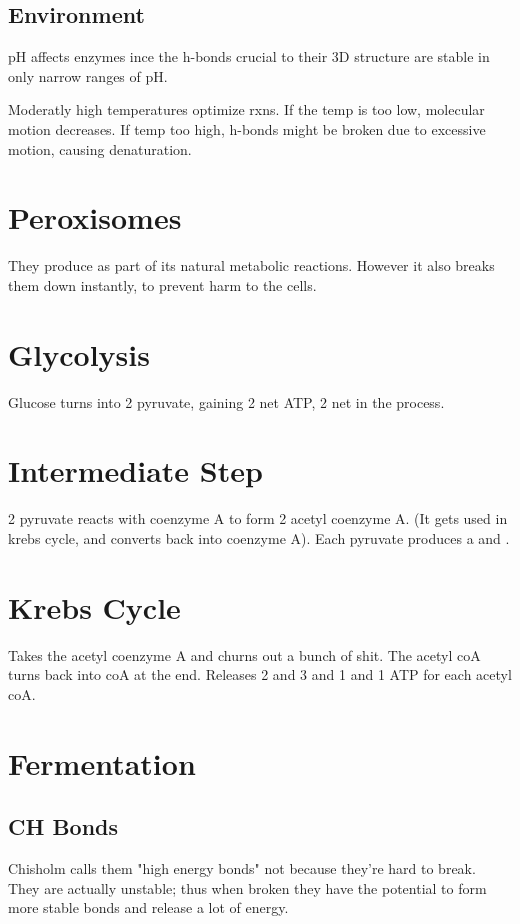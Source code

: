\documentclass[12pt]{article}
\begin{document}
\subsection{Environment}
pH affects enzymes ince the h-bonds crucial to their 3D structure
are stable in only narrow ranges of pH. 

Moderatly high temperatures optimize rxns. If the temp is too low, 
molecular motion decreases. If temp too high, h-bonds might 
be broken due to excessive motion, causing denaturation. 

\section{Peroxisomes}
They produce  as part of its natural metabolic reactions.
However it also breaks them down instantly, to prevent
harm to the cells. 

\section{Glycolysis}
Glucose turns into 2 pyruvate, gaining 2 net ATP, 2 net  in the process.

\section{Intermediate Step}
2 pyruvate reacts with coenzyme A to 
form 2 acetyl coenzyme A.
(It gets used in krebs cycle, and converts back
into coenzyme A). Each pyruvate produces a 
and .

\section{Krebs Cycle}
Takes the acetyl coenzyme A and churns out a bunch of shit. The
acetyl coA turns back into coA at the end. 
Releases 2 
and 3 and 1  and 1 ATP for each acetyl coA.

\section{Fermentation}

\subsection{CH Bonds}
Chisholm calls them "high energy bonds" not because they're hard to break.
They are actually unstable; thus when broken they have the potential
to form more stable bonds and release a lot of energy. 
\end{document}
